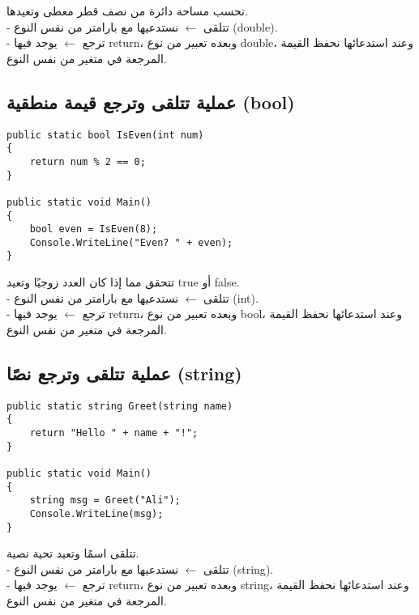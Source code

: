 \documentclass[12pt]{article}
\begin{document}
تحسب مساحة دائرة من نصف قطر معطى وتعيدها. \\
- تتلقى $\leftarrow$ نستدعيها مع بارامتر من نفس النوع (\textenglish{double}). \\
- ترجع $\leftarrow$ يوجد فيها \textenglish{return}، وبعده تعبير من نوع \textenglish{double}،
  وعند استدعائها نحفظ القيمة المرجعة في متغير من نفس النوع.



\subsection{عملية تتلقى وترجع قيمة منطقية (\textenglish{bool})}
\begin{boxExample}
\begin{english}
\begin{verbatim}
public static bool IsEven(int num)
{
    return num % 2 == 0;
}

public static void Main()
{
    bool even = IsEven(8);
    Console.WriteLine("Even? " + even);
}
\end{verbatim}
\end{english}
\end{boxExample}

تتحقق مما إذا كان العدد زوجيًا وتعيد \textenglish{true} أو \textenglish{false}. \\
- تتلقى $\leftarrow$ نستدعيها مع بارامتر من نفس النوع (\textenglish{int}). \\
- ترجع $\leftarrow$ يوجد فيها \textenglish{return}، وبعده تعبير من نوع \textenglish{bool}،
  وعند استدعائها نحفظ القيمة المرجعة في متغير من نفس النوع.



\subsection{عملية تتلقى وترجع نصًا (\textenglish{string})}
\begin{boxExample}
\begin{english}
\begin{verbatim}
public static string Greet(string name)
{
    return "Hello " + name + "!";
}

public static void Main()
{
    string msg = Greet("Ali");
    Console.WriteLine(msg);
}
\end{verbatim}
\end{english}
\end{boxExample}

تتلقى اسمًا وتعيد تحية نصية. \\
- تتلقى $\leftarrow$ نستدعيها مع بارامتر من نفس النوع (\textenglish{string}). \\
- ترجع $\leftarrow$ يوجد فيها \textenglish{return}، وبعده تعبير من نوع \textenglish{string}،
  وعند استدعائها نحفظ القيمة المرجعة في متغير من نفس النوع.
\end{document}

